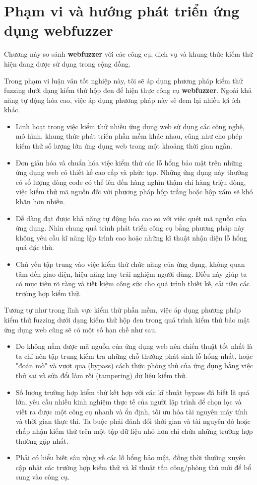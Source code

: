 \chapter{Phạm vi và hướng phát triển ứng dụng webfuzzer}
Chương này so sánh \textbf{webfuzzer} với các công cụ, dịch vụ và khung thức kiểm thử hiện đang được sử dụng trong cộng đồng.\par
Trong phạm vi luận văn tốt nghiệp này, tôi sẽ áp dụng phương pháp kiểm thử fuzzing dưới dạng kiểm thử hộp đen để hiện thực công cụ \textbf{webfuzzer}. Ngoài khả năng tự động hóa cao, việc áp dụng phương pháp này sẽ đem lại nhiều lợi ích khác.
\begin{itemize}
    \item Linh hoạt trong việc kiểm thử nhiều ứng dụng web sử dụng các công nghệ, mô hình, khung thức phát triển phần mềm khác nhau, cũng như cho phép kiểm thử số lượng lớn ứng dụng web trong một khoảng thời gian ngắn.
    \item Đơn giản hóa và chuẩn hóa việc kiểm thử các lỗ hổng bảo mật trên những ứng dụng web có thiết kế cao cấp và phức tạp. Những ứng dụng này thường có số lượng dòng code có thể lên đến hàng nghìn thậm chí hàng triệu dòng, việc kiểm thử mã nguồn đối với phương pháp hộp trắng hoặc hộp xám sẽ khó khăn hơn nhiều.
    \item Dễ dàng đạt được khả năng tự động hóa cao so với việc quét mã nguồn của ứng dụng. Nhìn chung quá trình phát triển công cụ bằng phương pháp này không yêu cầu kĩ năng lập trình cao hoặc những kĩ thuật nhận diện lỗ hổng quá đặc thù.
    \item Chủ yếu tập trung vào việc kiểm thử chức năng của ứng dụng, không quan tâm đến giao diện, hiệu năng hay trải nghiệm người dùng. Điều này giúp ta có mục tiêu rõ ràng và tiết kiệm công sức cho quá trình thiết kế, cải tiến các trường hợp kiểm thử. 
\end{itemize}
Tương tự như trong lĩnh vực kiểm thử phần mềm, việc áp dụng phương pháp kiểm thử fuzzing dưới dạng kiểm thử hộp đen trong quá trình kiểm thử bảo mật ứng dụng web cũng sẽ có một số hạn chế như sau.
\begin{itemize}
    \item Do không nắm được mã nguồn của ứng dụng web nên chiến thuật tốt nhất là ta chỉ nên tập trung kiểm tra những chỗ thường phát sinh lỗ hổng nhất, hoặc "đoán mò" và vượt qua (bypass) cách thức phòng thủ của ứng dụng bằng việc thử sai và sửa đổi làm rối (tampering) dữ liệu kiểm thử.
    \item Số lượng trường hợp kiểm thử kết hợp với các kĩ thuật bypass đã biết là quá lớn, yêu cầu nhiều kinh nghiệm thực tế của người lập trình để chọn lọc và viết ra được một công cụ nhanh và ổn định, tối ưu hóa tài nguyên máy tính và thời gian thực thi. Ta buộc phải đánh đổi thời gian và tài nguyên đó hoặc chấp nhận kiểm thử trên một tập dữ liệu nhỏ hơn chỉ chứa những trường hợp thường gặp nhất.
    \item Phải có hiểu biết sâu rộng về các lỗ hổng bảo mật, đồng thời thường xuyên cập nhật các trường hợp kiểm thử và kĩ thuật tấn công/phòng thủ mới để bổ sung vào công cụ.
\end{itemize}
